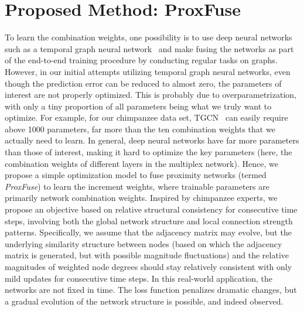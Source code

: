 \documentclass{article}
\theoremstyle{plain}
\theoremstyle{definition}
\theoremstyle{remark}
\begin{document}
\section{Proposed Method: ProxFuse}
\label{sec:proposed_method}
To learn the combination weights, one possibility is to use deep neural networks such as a temporal graph neural network~\cite{rozemberczki2021pytorch} and make fusing the networks as part of the end-to-end training procedure by conducting regular tasks on graphs. However, in our initial attempts utilizing temporal graph neural networks, even though the prediction error can be reduced to almost zero, the parameters of interest are not properly optimized. This is probably due to overparametrization, with only a tiny proportion of all parameters being what we truly want to optimize. For example, for our chimpanzee data set, TGCN~\cite{zhao2019t} can easily require above 1000 parameters, far more than the ten combination weights that we actually need to learn. In general, deep neural networks have far more parameters than those of interest, making it hard to optimize the key parameters (here, the combination weights of different layers in the multiplex network). Hence, we propose a simple optimization model to fuse proximity networks (termed \emph{ProxFuse}) to learn the increment weights, where trainable parameters are primarily network combination weights. Inspired by chimpanzee experts, we propose an objective based on relative structural consistency for consecutive time steps, involving both the global network structure and local connection strength patterns. Specifically, we assume that the adjacency matrix may evolve, but the underlying similarity structure between nodes (based on which the adjacency matrix is generated, but with possible magnitude fluctuations) and the relative magnitudes of weighted node degrees should stay relatively consistent with only mild updates for consecutive time steps. In this real-world application, the networks are not fixed in time. The loss function penalizes dramatic changes, but a gradual evolution of the network structure is possible, and indeed observed.
\end{document}
